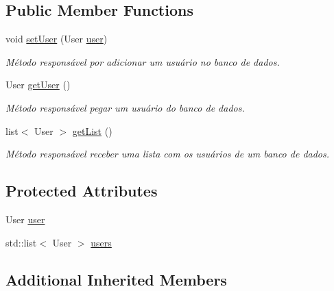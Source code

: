 \subsection*{Public Member Functions}
\begin{DoxyCompactItemize}
\item 
void \hyperlink{class_user_command_a9a9763f3b2b3b268a1b7c7ab7c5b8f19}{set\-User} (User \hyperlink{class_user_command_a70c92f418986d19c46252d6cf5b77704}{user})
\begin{DoxyCompactList}\small\item\em Método responsável por adicionar um usuário no banco de dados. \end{DoxyCompactList}\item 
\hypertarget{class_user_command_a6dac24afd2867d55993765135c459fff}{User \hyperlink{class_user_command_a6dac24afd2867d55993765135c459fff}{get\-User} ()}\label{class_user_command_a6dac24afd2867d55993765135c459fff}

\begin{DoxyCompactList}\small\item\em Método responsável pegar um usuário do banco de dados. \end{DoxyCompactList}\item 
\hypertarget{class_user_command_a825103f7f6bc1d4fcf205f91926de104}{list$<$ User $>$ \hyperlink{class_user_command_a825103f7f6bc1d4fcf205f91926de104}{get\-List} ()}\label{class_user_command_a825103f7f6bc1d4fcf205f91926de104}

\begin{DoxyCompactList}\small\item\em Método responsável receber uma lista com os usuários de um banco de dados. \end{DoxyCompactList}\end{DoxyCompactItemize}
\subsection*{Protected Attributes}
\begin{DoxyCompactItemize}
\item 
User \hyperlink{class_user_command_a70c92f418986d19c46252d6cf5b77704}{user}
\item 
std\-::list$<$ User $>$ \hyperlink{class_user_command_ab0d1d3e37f63ce84d46ac7540236765f}{users}
\end{DoxyCompactItemize}
\subsection*{Additional Inherited Members}


